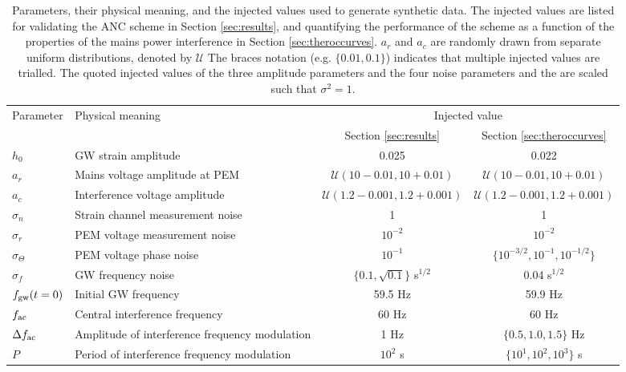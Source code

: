 \documentclass[pra,superscriptaddress,reprint,amsmath,amssymb,nofootinbib]{revtex4-2}
\begin{document}
\begin{table}
\begin{tabular}{llcc}
		 \multirow{2}{*}{Parameter} & \multirow{2}{*}{Physical meaning}  & \multicolumn{2}{c}{Injected value} \\
		\cline{3-4}
			 &  &Section \ref{sec:results} & Section \ref{sec:theroccurves}    \\
		\hline
		$h_0$  &    GW strain amplitude & 0.025& 0.022 \\ 
		$a_r$ & Mains voltage amplitude at PEM & $\mathcal{U}(10-0.01,10+0.01)$& $\mathcal{U}(10-0.01,10+0.01)$ \\
		$a_c$ & Interference voltage amplitude &$\mathcal{U}(1.2-0.001,1.2+0.001)$& $\mathcal{U}(1.2-0.001,1.2+0.001)$ \\
		$\sigma_n$ & Strain channel measurement noise &1& 1 \\
		$\sigma_r$  & PEM voltage measurement noise & $10^{-2}$&$10^{-2}$ \\
		$\sigma_{\Theta}$ & PEM voltage phase noise  & $10^{-1}$& $\{ 10^{-3/2}, 10^{-1}, 10^{-1/2}\}$\\
		$\sigma_f$ &  GW frequency noise & $\{0.1,\sqrt{0.1}\}$ s$^{1/2}$& 0.04 s$^{1/2}$\\
		$f_{\rm gw}(t=0)$ &  Initial GW frequency  & 59.5 Hz& 59.9 Hz\\
		$ f_{\rm ac}$ &  Central interference frequency & 60 Hz& 60 Hz\\ 
		$\Delta f_{\rm ac}$ &  Amplitude of interference frequency modulation  & 1 Hz& $\{0.5, 1.0, 1.5\}$ Hz\\
		$P$ & Period of interference frequency modulation & $10^2$ s& $\{ 10^{1}, 10^2, 10^3\}$ s \\
		\hline
	\end{tabular} 
	\caption{Parameters, their physical meaning, and the injected values used to generate synthetic data. The injected values are listed for validating the ANC scheme in Section \ref{sec:results}, and quantifying the performance of the scheme as a function of the properties of the mains power interference in Section  \ref{sec:theroccurves}. $a_r$ and $a_c$ are randomly drawn from separate uniform distributions, denoted by $\mathcal{U}$ The braces notation (e.g. $\{0.01, 0.1\}$) indicates that multiple injected values are trialled. The quoted injected values of the three amplitude parameters and the four noise parameters and the are scaled such that $\sigma^2 = 1$.}
	\label{tab:parameterdescription1}
\end{table}
\end{document}
